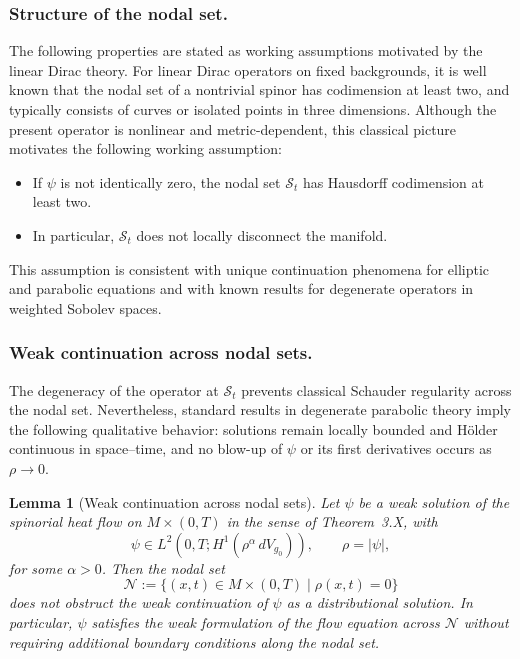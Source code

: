 \documentclass[11pt, reqno, a4paper]{amsart}
\newtheorem{lemma}[theorem]{Lemma}
\theoremstyle{definition}
\theoremstyle{remark}
\begin{document}
\subsubsection{Structure of the nodal set.}
The following properties are stated as working assumptions motivated by the linear Dirac theory. For linear Dirac operators on fixed backgrounds, it is well known that the nodal set of a nontrivial spinor has codimension at least two, and typically consists of curves or isolated points in three dimensions. Although the present operator is nonlinear and metric-dependent, this classical picture motivates the following working assumption:

\begin{itemize}
\item If $\psi$ is not identically zero, the nodal set $\mathcal{S}_t$ has
Hausdorff codimension at least two.
\item In particular, $\mathcal{S}_t$ does not locally disconnect the manifold.
\end{itemize}

This assumption is consistent with unique continuation phenomena for elliptic and
parabolic equations and with known results for degenerate operators in weighted
Sobolev spaces.

\subsubsection{Weak continuation across nodal sets.}
The degeneracy of the operator at $\mathcal{S}_t$ prevents classical Schauder
regularity across the nodal set. Nevertheless, standard results in degenerate
parabolic theory imply the following qualitative behavior:
solutions remain locally bounded and H\"older continuous in space--time,
and no blow-up of $\psi$ or its first derivatives occurs as $\rho \to 0$.


\begin{lemma}[Weak continuation across nodal sets]
\label{lem:local_boundedness}
Let $\psi$ be a weak solution of the spinorial heat flow on $M \times (0,T)$
in the sense of Theorem~3.X, with
\[
\psi \in L^2(0,T; H^1(\rho^\alpha\, dV_{g_0})), \qquad \rho = |\psi|,
\]
for some $\alpha>0$.
Then the nodal set
\[
\mathcal{N} := \{ (x,t) \in M \times (0,T) \mid \rho(x,t)=0 \}
\]
does not obstruct the weak continuation of $\psi$ as a distributional
solution.
In particular, $\psi$ satisfies the weak formulation of the flow equation
across $\mathcal{N}$ without requiring additional boundary conditions
along the nodal set.
\end{lemma}
\end{document}
